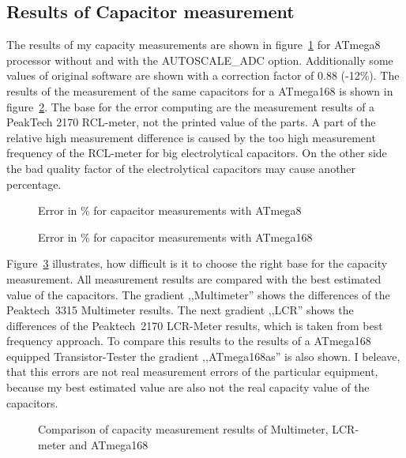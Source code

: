 \subsection{Results of Capacitor measurement}
The results of my capacity measurements are shown in figure~\ref{fig:mega8cap} for ATmega8 processor without and 
with the AUTOSCALE\_ADC option. Additionally some values of original software are shown with a correction factor
of 0.88 (-12\%).
The results of the measurement of the same capacitors for a ATmega168 is shown in figure~\ref{fig:mega168cap}.
The base for the error computing are the measurement results of a PeakTech 2170 RCL-meter, not the printed value
of the parts.
A part of the relative high measurement difference is caused by the too high measurement frequency of the RCL-meter for big
electrolytical capacitors. On the other side the bad quality factor of the electrolytical capacitors may cause
another percentage.

\begin{figure}[H]
\centering

\caption{Error in \% for capacitor measurements with ATmega8 }
\label{fig:mega8cap}
\end{figure}

\begin{figure}[H]
\centering

\caption{Error in \% for capacitor measurements with ATmega168 }
\label{fig:mega168cap}
\end{figure}

Figure~\ref{fig:capcompare} illustrates, how difficult is it to choose the right base for the capacity measurement.
All measurement results are compared with the best estimated value of the capacitors.
The gradient ,,Multimeter'' shows the differences of the Peaktech~3315 Multimeter results.
The next gradient ,,LCR'' shows the differences of the Peaktech~2170 LCR-Meter results, which is taken from best frequency approach.
To compare this results to the results of a ATmega168 equipped Transistor-Tester the gradient ,,ATmega168as'' is also shown.
I beleave, that this errors are not real measurement errors of the particular equipment, because my best estimated value are
also not the real capacity value of the capacitors.

\begin{figure}[H]
\centering

\caption{Comparison of capacity measurement results of Multimeter, LCR-meter and ATmega168}
\label{fig:capcompare}
\end{figure}

